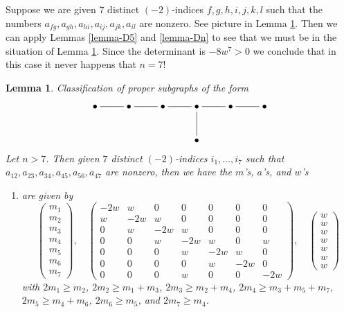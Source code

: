 \documentclass{stacks-project}
\theoremstyle{plain}
\newtheorem{lemma}[subsection]{Lemma}
\theoremstyle{definition}
\theoremstyle{remark}
\numberwithin{equation}{subsection}
\begin{document}
\noindent
Suppose we are given $7$ distinct $(-2)$-indices $f, g, h, i, j, k, l$
such that the numbers
$a_{fg}, a_{gh}, a_{hi}, a_{ij}, a_{jk}, a_{il}$ are nonzero.
See picture in Lemma \ref{lemma-E7}. Then we can apply
Lemmas \ref{lemma-D5} and \ref{lemma-Dn}
to see that we must be in the situation
of Lemma \ref{lemma-E7}. Since the determinant is $-8w^7 > 0$
we conclude that in this case it never happens that $n = 7$!

\begin{lemma}
\label{lemma-E7}
Classification of proper subgraphs of the form
$$
\xymatrix{
\bullet \ar@{-}[r] & \bullet \ar@{-}[r] & \bullet \ar@{-}[r] &
\bullet \ar@{-}[r] \ar@{-}[d] & \bullet \ar@{-}[r] & \bullet \\
& & & \bullet
}
$$
Let $n > 7$. Then given $7$ distinct $(-2)$-indices $i_1, \ldots, i_7$
such that $a_{12}, a_{23}, a_{34}, a_{45}, a_{56}, a_{47}$ are nonzero,
then we have the $m$'s, $a$'s, and $w$'s
\begin{enumerate}
\item
\label{item-E7}
are given by
$$
\left(
\begin{matrix}
m_1 \\
m_2 \\
m_3 \\
m_4 \\
m_5 \\
m_6 \\
m_7
\end{matrix}
\right),
\quad
\left(
\begin{matrix}
-2w & w & 0 & 0 & 0 & 0 & 0 \\
w & -2w & w & 0 & 0 & 0 & 0 \\
0 & w & -2w & w & 0 & 0 & 0 \\
0 & 0 & w & -2w & w & 0 & w \\
0 & 0 & 0 & w & -2w & w & 0 \\
0 & 0 & 0 & 0 & w & -2w & 0 \\
0 & 0 & 0 & w & 0 & 0 & -2w
\end{matrix}
\right),
\quad
\left(
\begin{matrix}
w \\
w \\
w \\
w \\
w \\
w \\
w
\end{matrix}
\right)
$$
with $2m_1 \geq m_2$, $2m_2 \geq m_1 + m_3$, $2m_3 \geq m_2 + m_4$,
$2m_4 \geq m_3 + m_5 + m_7$, $2m_5 \geq m_4 + m_6$, $2m_6 \geq m_5$,
and $2m_7 \geq m_4$.
\end{enumerate}
\end{lemma}
\end{document}
